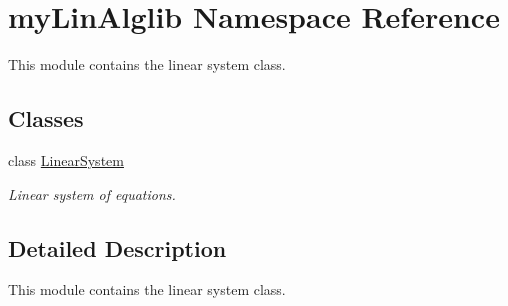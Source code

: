 \hypertarget{namespacemyLinAlglib}{}\section{my\+Lin\+Alglib Namespace Reference}
\label{namespacemyLinAlglib}


This module contains the linear system class.  


\subsection*{Classes}
\begin{DoxyCompactItemize}
\item 
class \mbox{\hyperlink{classmyLinAlglib_1_1LinearSystem}{Linear\+System}}
\begin{DoxyCompactList}\small\item\em Linear system of equations. \end{DoxyCompactList}\end{DoxyCompactItemize}


\subsection{Detailed Description}
This module contains the linear system class. 